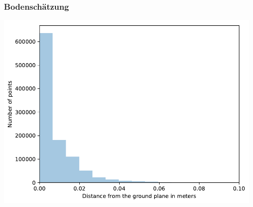 \begin{frame}
    \frametitle{Bodenschätzung}
    \includegraphics[width=\textwidth]{../Material/ground.pdf}
\end{frame}

